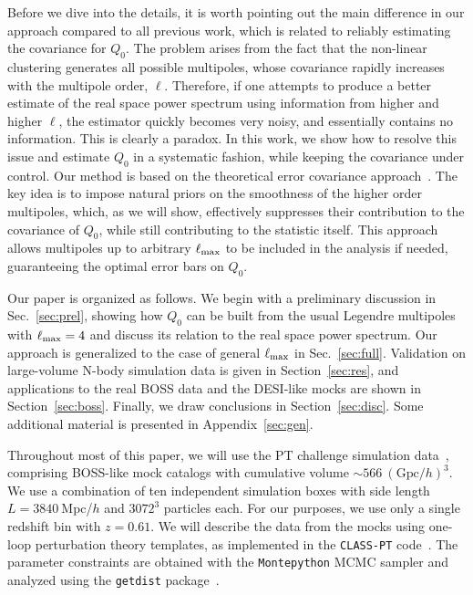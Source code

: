 \documentclass[12pt,a4paper]{article}
\newcommand{\lmax}{\ell_{\rm max}}
\begin{document}
Before we dive into the details, it is worth pointing out the main difference in our approach compared to all previous work, which is related to reliably estimating the covariance for $Q_0$. The problem 
arises from the fact that the non-linear clustering generates all possible multipoles, 
whose covariance rapidly increases with the multipole order, $\ell$. Therefore, if one attempts to produce a better estimate of the real space power spectrum using information from higher and higher $\ell$, the estimator quickly becomes very noisy, and essentially contains no information. This is clearly a paradox. In this work, we show how to resolve this issue and estimate $Q_0$ in a systematic fashion, while keeping the covariance under control. Our method is based on the theoretical error covariance approach~\cite{Baldauf:2016sjb,Chudaykin:2020hbf}. The key idea is to impose natural priors on the smoothness of the higher order multipoles, which, as we will show, effectively suppresses their contribution to the covariance of $Q_0$, while still contributing to the statistic itself. This approach allows multipoles up to arbitrary $\ell_{\rm max}$ to be included in the analysis if needed, guaranteeing the optimal error bars on $Q_0$. 


Our paper is organized as follows. We begin with a preliminary discussion in Sec.~\ref{sec:prel}, showing how $Q_0$ can be built from the usual Legendre multipoles with $\lmax=4$ and discuss its relation to the real space power spectrum. Our approach is generalized 
to the case of general $\lmax$ in Sec.~\ref{sec:full}. 
Validation on large-volume N-body simulation data is given in Section~\ref{sec:res}, and applications to the real BOSS data and 
the DESI-like mocks are shown in Section~\ref{sec:boss}.
Finally, we draw conclusions 
in Section~\ref{sec:disc}. Some additional material 
is presented in Appendix~\ref{sec:gen}.

Throughout most of this paper, we will use the PT challenge simulation data~\cite{Nishimichi:2020tvu}, comprising BOSS-like mock catalogs with cumulative volume $\sim 566~(\text{Gpc}/h)^3$. We use a combination of ten independent simulation boxes 
with side length $L=3840~$Mpc/$h$ and $3072^3$ particles each.  
For our purposes, we use only a single redshift bin with $z=0.61$. We will describe the data from the mocks using one-loop perturbation theory templates, as implemented in the \texttt{CLASS-PT} code~\cite{Chudaykin:2020aoj}. The parameter constraints are obtained with
the \texttt{Montepython} MCMC sampler \cite{Brinckmann:2018cvx,Audren:2012wb} and analyzed using the \texttt{getdist} package~\cite{Lewis:2019xzd}.
\end{document}
